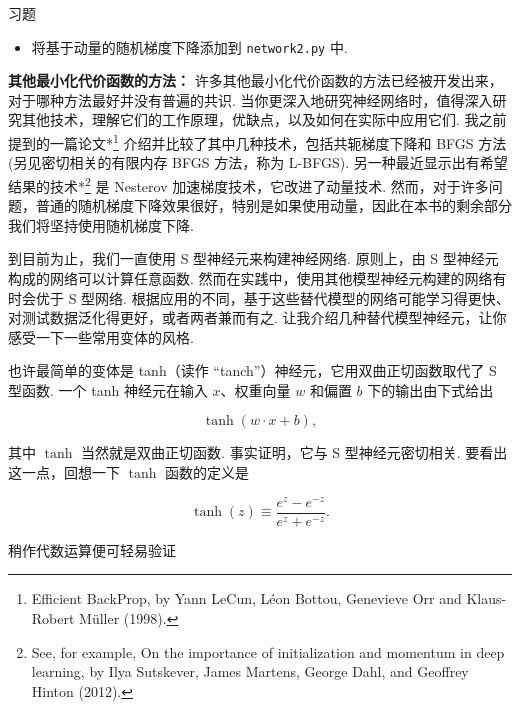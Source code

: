 \begin{exerciseBox}{习题}

\begin{itemize}

\item 将基于动量的随机梯度下降添加到 \texttt{network2.py} 中.

\end{itemize}

\textbf{其他最小化代价函数的方法：} 许多其他最小化代价函数的方法已经被开发出来，对于哪种方法最好并没有普遍的共识. 当你更深入地研究神经网络时，值得深入研究其他技术，理解它们的工作原理，优缺点，以及如何在实际中应用它们. 我之前提到的一篇论文*\footnote{Efficient BackProp, by Yann LeCun, Léon Bottou, Genevieve Orr and Klaus-Robert Müller (1998).} 介绍并比较了其中几种技术，包括共轭梯度下降和 BFGS 方法(另见密切相关的有限内存 BFGS 方法，称为 L-BFGS). 另一种最近显示出有希望结果的技术*\footnote{See, for example, On the importance of initialization and momentum in deep learning, by Ilya Sutskever, James Martens, George Dahl, and Geoffrey Hinton (2012).} 是 Nesterov 加速梯度技术，它改进了动量技术. 然而，对于许多问题，普通的随机梯度下降效果很好，特别是如果使用动量，因此在本书的剩余部分我们将坚持使用随机梯度下降.

\end{exerciseBox}

到目前为止，我们一直使用 S 型神经元来构建神经网络. 原则上，由 S 型神经元构成的网络可以计算任意函数. 然而在实践中，使用其他模型神经元构建的网络有时会优于 S 型网络. 根据应用的不同，基于这些替代模型的网络可能学习得更快、对测试数据泛化得更好，或者两者兼而有之. 让我介绍几种替代模型神经元，让你感受一下一些常用变体的风格.

也许最简单的变体是 tanh（读作 ``tanch''）神经元，它用双曲正切函数取代了 S 型函数. 一个 tanh 神经元在输入 $x$、权重向量 $w$ 和偏置 $b$ 下的输出由下式给出

\begin{equation}
\tanh(w \cdot x+b),
\tag{109}
\end{equation}

\noindent 其中 $\tanh$ 当然就是双曲正切函数. 事实证明，它与 S 型神经元密切相关. 要看出这一点，回想一下 $\tanh$ 函数的定义是

\begin{equation}
\tanh(z) \equiv \frac{e^z-e^{-z}}{e^z+e^{-z}}.
\tag{110}
\end{equation}

\noindent 稍作代数运算便可轻易验证

